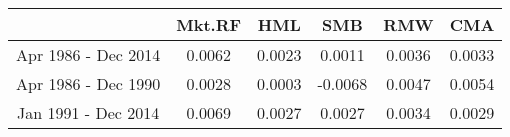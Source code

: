 \begin{tabular}{cccccc}
  \hline
 & Mkt.RF & HML & SMB & RMW & CMA \\ 
  \hline
Apr 1986 - Dec 2014 & 0.0062 & 0.0023 & 0.0011 & 0.0036 & 0.0033 \\ 
  Apr 1986 - Dec 1990 & 0.0028 & 0.0003 & -0.0068 & 0.0047 & 0.0054 \\ 
  Jan 1991 - Dec 2014 & 0.0069 & 0.0027 & 0.0027 & 0.0034 & 0.0029 \\ 
   \hline
\end{tabular}
